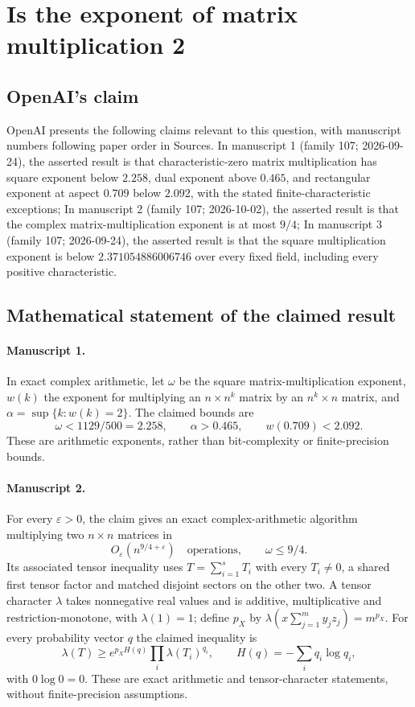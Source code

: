 \documentclass[11pt]{article}
\begin{document}
\section*{Is the exponent of matrix multiplication 2}

\subsection{OpenAI's claim}
OpenAI presents the following claims relevant to this question, with manuscript numbers following paper order in Sources. In manuscript 1 (family 107; 2026-09-24), the asserted result is that characteristic-zero matrix multiplication has square exponent below $2.258$, dual exponent above $0.465$, and rectangular exponent at aspect $0.709$ below $2.092$, with the stated finite-characteristic exceptions; In manuscript 2 (family 107; 2026-10-02), the asserted result is that the complex matrix-multiplication exponent is at most $9/4$; In manuscript 3 (family 107; 2026-09-24), the asserted result is that the square multiplication exponent is below $2.371054886006746$ over every fixed field, including every positive characteristic.

\subsection{Mathematical statement of the claimed result}
\paragraph{Manuscript 1.}
In exact complex arithmetic, let $\omega$ be the square matrix-multiplication exponent, $w(k)$ the exponent for multiplying an $n\times n^k$ matrix by an $n^k\times n$ matrix, and $\alpha=\sup\{k:w(k)=2\}$. The claimed bounds are
\[
 \omega<1129/500=2.258,\qquad\alpha>0.465,\qquad w(0.709)<2.092.
\]
These are arithmetic exponents, rather than bit-complexity or finite-precision bounds.

\paragraph{Manuscript 2.}
For every $\varepsilon>0$, the claim gives an exact complex-arithmetic algorithm multiplying two $n\times n$ matrices in
\[
 O_{\varepsilon}(n^{9/4+\varepsilon})\quad\text{operations},\qquad\omega\le9/4.
\]
Its associated tensor inequality uses $T=\sum_{i=1}^sT_i$ with every $T_i\ne0$, a shared first tensor factor and matched disjoint sectors on the other two. A tensor character $\lambda$ takes nonnegative real values and is additive, multiplicative and restriction-monotone, with $\lambda(1)=1$; define $p_X$ by $\lambda(x\sum_{j=1}^my_jz_j)=m^{p_X}$. For every probability vector $q$ the claimed inequality is
\[
 \lambda(T)\ge e^{p_XH(q)}\prod_i\lambda(T_i)^{q_i},\qquad
 H(q)=-\sum_iq_i\log q_i,
\]
with $0\log0=0$. These are exact arithmetic and tensor-character statements, without finite-precision assumptions.
\end{document}
